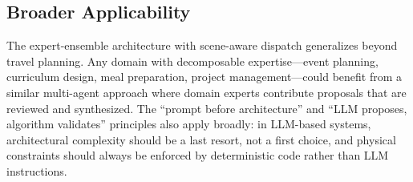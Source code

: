 \subsection{Broader Applicability}

The expert-ensemble architecture with scene-aware dispatch generalizes beyond travel planning. Any domain with decomposable expertise---event planning, curriculum design, meal preparation, project management---could benefit from a similar multi-agent approach where domain experts contribute proposals that are reviewed and synthesized. The ``prompt before architecture'' and ``LLM proposes, algorithm validates'' principles also apply broadly: in LLM-based systems, architectural complexity should be a last resort, not a first choice, and physical constraints should always be enforced by deterministic code rather than LLM instructions.
